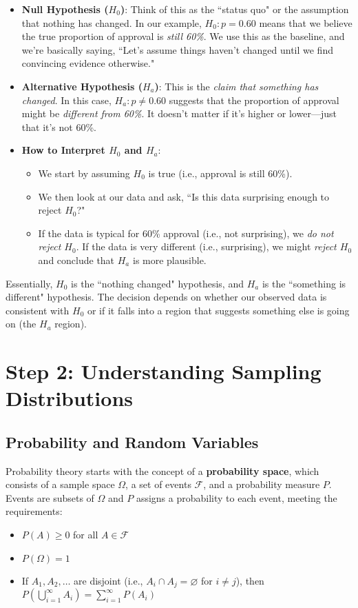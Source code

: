\documentclass[11pt]{article}
\let\emptyset\varnothing
\begin{document}
\begin{itemize}
    \item \textbf{Null Hypothesis (\( H_0 \))}: Think of this as the ``status quo" or the assumption that nothing has changed. In our example, \( H_0: p = 0.60 \) means that we believe the true proportion of approval is \emph{still 60\%}. We use this as the baseline, and we're basically saying, ``Let's assume things haven't changed until we find convincing evidence otherwise."
    \item \textbf{Alternative Hypothesis (\( H_a \))}: This is the \emph{claim that something has changed}. In this case, \( H_a: p \neq 0.60 \) suggests that the proportion of approval might be \emph{different from 60\%}. It doesn't matter if it's higher or lower—just that it's not 60\%.
    \item \textbf{How to Interpret \( H_0 \) and \( H_a \)}:
    \begin{itemize}
        \item We start by assuming \( H_0 \) is true (i.e., approval is still 60\%).
        \item We then look at our data and ask, ``Is this data surprising enough to reject \( H_0 \)?"
        \item If the data is typical for 60\% approval (i.e., not surprising), we \emph{do not reject \( H_0 \)}. If the data is very different (i.e., surprising), we might \emph{reject \( H_0 \)} and conclude that \( H_a \) is more plausible.
    \end{itemize}
\end{itemize}

Essentially, \( H_0 \) is the ``nothing changed" hypothesis, and \( H_a \) is the ``something is different" hypothesis. The decision depends on whether our observed data is consistent with \( H_0 \) or if it falls into a region that suggests something else is going on (the \( H_a \) region).

\section*{Step 2: Understanding Sampling Distributions}

\subsection*{Probability and Random Variables}

Probability theory starts with the concept of a \textbf{probability space}, which consists of a sample space \( \Omega \), a set of events \( \mathcal{F} \), and a probability measure \( P \). Events are subsets of \( \Omega \) and \( P \) assigns a probability to each event, meeting the requirements:
\begin{itemize}
  \item \( P(A) \geq 0 \) for all \( A \in \mathcal{F} \)
  \item \( P(\Omega) = 1 \)
  \item If \( A_1, A_2, \ldots \) are disjoint (i.e., \( A_i \cap A_j = \emptyset \) for \( i \neq j \)), then \( P\left(\bigcup_{i=1}^\infty A_i\right) = \sum_{i=1}^\infty P(A_i) \)
\end{itemize}
\end{document}
